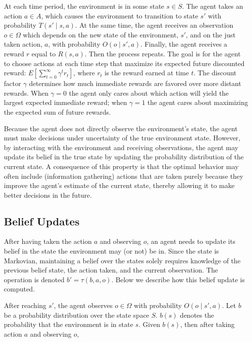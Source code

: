 \documentclass[english]{article}
\numberwithin{equation}{section}
\begin{document}
At each time period, the environment is in some state $s \in S$.  The agent takes an action $a \in A$, which causes the environment to transition to state $s'$ with probability $T(s'\mid s,a)$. At the same time, the agent receives an observation $o \in \Omega$ which depends on the new state of the environment, $s'$, and on the just taken action, $a$, with probability $O(o \mid s',a)$. Finally, the agent receives a reward $r$ equal to $R(s, a)$. Then the process repeats. The goal is for the agent to choose actions at each time step that maximize its expected future discounted reward: $E \left[ \sum_{t=0}^\infty \gamma^t r_t \right]$, where $r_t$ is the reward earned at time $t$. The discount factor $\gamma$ determines how much immediate rewards are favored over more distant rewards. When $\gamma=0$ the agent only cares about which action will yield the largest expected immediate reward; when $\gamma=1$ the agent cares about maximizing the expected sum of future rewards.

Because the agent does not directly observe the environment's state, the agent must make decisions under uncertainty of the true environment state. However, by interacting with the environment and receiving observations, the agent may update its belief in the true state by updating the probability distribution of the current state. A consequence of this property is that the optimal behavior may often include (information gathering) actions that are taken purely because they improve the agent's estimate of the current state, thereby allowing it to make better decisions in the future.

\subsection{Belief Updates}
After having taken the action $a$ and observing $o$, an agent needs to update its belief in the state the environment may (or not) be in. Since the state is Markovian, maintaining a belief over the states solely requires knowledge of the previous belief state, the action taken, and the current observation. The operation is denoted $b' = \tau(b,a,o)$. Below we describe how this belief update is computed.

After reaching $s'$, the agent observes $o \in \Omega$ with probability $O(o\mid s',a)$. Let $b$ be a probability distribution over the state space $S$. $b(s)$ denotes the probability that the environment is in state $s$. Given $b(s)$, then after taking action $a$ and observing $o$,
\end{document}
